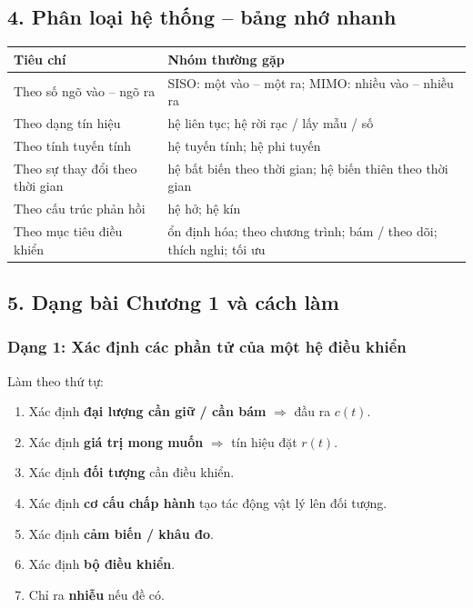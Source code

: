 \subsection*{4. Phân loại hệ thống -- bảng nhớ nhanh}

\begin{center}
\small
\begin{tabular}{|p{}|p{}|}
\hline
\textbf{Tiêu chí} & \textbf{Nhóm thường gặp}\\
\hline
Theo số ngõ vào -- ngõ ra & SISO: một vào -- một ra; MIMO: nhiều vào -- nhiều ra\\
\hline
Theo dạng tín hiệu & hệ liên tục; hệ rời rạc / lấy mẫu / số\\
\hline
Theo tính tuyến tính & hệ tuyến tính; hệ phi tuyến\\
\hline
Theo sự thay đổi theo thời gian & hệ bất biến theo thời gian; hệ biến thiên theo thời gian\\
\hline
Theo cấu trúc phản hồi & hệ hở; hệ kín\\
\hline
Theo mục tiêu điều khiển & ổn định hóa; theo chương trình; bám / theo dõi; thích nghi; tối ưu\\
\hline
\end{tabular}
\end{center}

\subsection*{5. Dạng bài Chương 1 và cách làm}

\subsubsection*{Dạng 1: Xác định các phần tử của một hệ điều khiển}

Làm theo thứ tự:
\begin{enumerate}[leftmargin=1.8em,itemsep=0.2em]
  \item Xác định \textbf{đại lượng cần giữ / cần bám} $\Rightarrow$ đầu ra $c(t)$.
  \item Xác định \textbf{giá trị mong muốn} $\Rightarrow$ tín hiệu đặt $r(t)$.
  \item Xác định \textbf{đối tượng} cần điều khiển.
  \item Xác định \textbf{cơ cấu chấp hành} tạo tác động vật lý lên đối tượng.
  \item Xác định \textbf{cảm biến / khâu đo}.
  \item Xác định \textbf{bộ điều khiển}.
  \item Chỉ ra \textbf{nhiễu} nếu đề có.
\end{enumerate}

